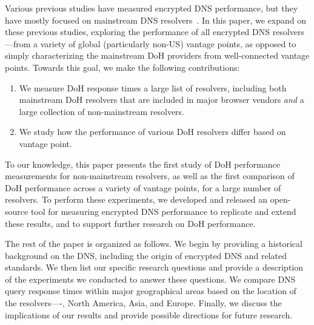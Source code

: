 Various previous studies have measured encrypted DNS performance, but they have mostly focused on mainstream DNS resolvers~\cite{borgolte2019dns,hounsel2020comparing,KResolver,lu2019end-to-end}.
In this paper, we expand on these previous studies, exploring the performance
of all encrypted DNS resolvers---from a variety of global (particularly
non-US) vantage points, as opposed to simply characterizing the mainstream DoH
providers from well-connected vantage points.
Towards this goal, we make the following contributions:
\begin{enumerate}
    \itemsep=-1pt
    \item We measure DoH response times a large list of resolvers, including
        both mainstream DoH resolvers that are included in major browser
        vendors {\em and} a large collection of non-mainstream resolvers.
    \item We study how the performance of various DoH resolvers differ based
        on vantage point.
\end{enumerate}
\noindent
To our knowledge, this paper presents the first study of DoH performance
measurements for non-mainstream resolvers, as well as the first comparison of
DoH performance across a variety of vantage points, for a large number of
resolvers.
To perform these experiments, we developed and released an open-source
tool for measuring encrypted DNS performance to replicate and extend these
results, and to support further research on DoH performance.

The rest of the paper is organized as follows.  We begin by providing a
historical background on the DNS, including the origin of encrypted DNS
and related standards.  We then list our specific research questions and
provide a description of the experiments we conducted to answer these
questions.  We compare DNS query response times within major geographical
areas based on the location of the resolvers—-\ie, North America, Asia,
and Europe.  Finally, we discuss the implications of our results and
provide possible directions for future research.
